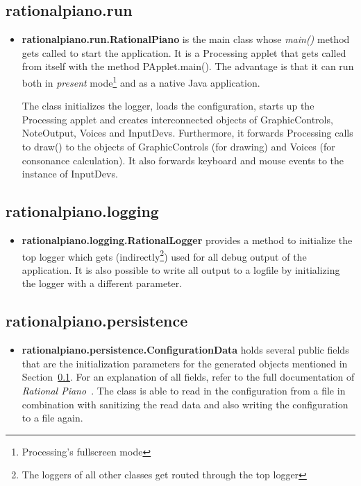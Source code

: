 \documentclass[12pt,a4paper,titlepage,oneside]{report}
\begin{document}
\subsection{rationalpiano.run}
\label{sec:Run}

\begin{itemize}
	\item \textbf{rationalpiano.run.RationalPiano} is the main class whose \emph{main()} method gets called to start the application. It is a Processing applet that gets called from itself with the method PApplet.main(). The advantage is that it can run both in \emph{present} mode\footnote{Processing's fullscreen mode} and as a native Java application.

	The class initializes the logger, loads the configuration, starts up the Processing applet and creates interconnected objects of GraphicControls, NoteOutput, Voices and InputDevs. Furthermore, it forwards Processing calls to draw() to the objects of GraphicControls (for drawing) and Voices (for consonance calculation). It also forwards keyboard and mouse events to the instance of InputDevs.
\end{itemize}


\subsection{rationalpiano.logging}

\begin{itemize}
	\item \textbf{rationalpiano.logging.RationalLogger} provides a method to initialize the top logger which gets (indirectly\footnote{The loggers of all other classes get routed through the top logger}) used for all debug output of the application. It is also possible to write all output to a logfile by initializing the logger with a different parameter.
\end{itemize}


\subsection{rationalpiano.persistence}

\begin{itemize}
	\item \textbf{rationalpiano.persistence.ConfigurationData} holds several public fields that are the initialization parameters for the generated objects mentioned in Section~\ref{sec:Run}. For an explanation of all fields, refer to the full documentation of \emph{Rational Piano}~\cite{bib:RationalPianoDoc}. The class is able to read in the configuration from a file in combination with sanitizing the read data and also writing the configuration to a file again.
\end{itemize}
\end{document}
